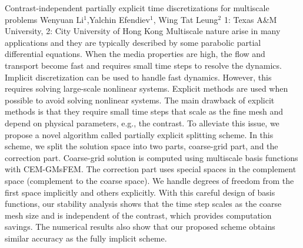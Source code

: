 \vspace{1.5ex}
\abs
{Contrast-independent partially explicit time discretizations for multiscale problems}
{Wenyuan Li$^{1}$,Yalchin Efendiev$^{1}$, Wing Tat Leung$^{2}$}
{1: Texas A\&M University, 2: City University of Hong Kong}
{Multiscale nature arise in many applications and they are typically described by some parabolic partial differential equations. When the media properties are high, the flow and transport become fast and requires small time steps to resolve the dynamics. Implicit 
discretization
can be used to handle fast dynamics. However, this requires
solving large-scale nonlinear systems. Explicit methods
are used when possible to avoid solving nonlinear systems.
 The main drawback of explicit methods is that they
require small time steps that scale as the fine mesh and depend
on physical parameters, e.g., the contrast. To alleviate this issue, 
we propose
a novel algorithm called partially explicit splitting scheme. In this scheme, we split the solution space into two parts, coarse-grid
part, and the correction part. Coarse-grid solution is computed using
multiscale basis functions with CEM-GMsFEM. The correction part 
uses special spaces in the complement space (complement to the coarse space). We handle degrees of freedom from the first space implicitly and others explicitly. With this careful design of basis functions, our stability analysis shows that the time step scales as the coarse mesh size and is independent of the contrast, which provides computation savings. The numerical results also show that our proposed scheme obtains similar accuracy as the fully implicit scheme.}


